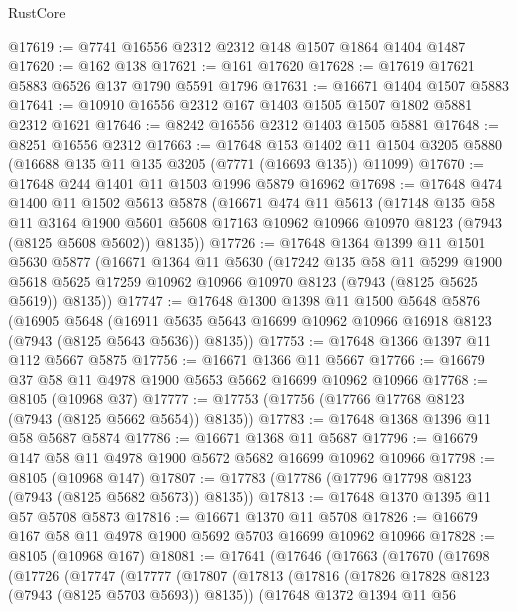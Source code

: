 \begin{lexlean}{RustCore}
\begin{coremodule}
@17619 := @7741 @16556 @2312 @2312 @148 @1507 @1864 @1404 @1487
@17620 := @162 @138
@17621 := @161 @17620
@17628 := @17619 @17621 @5883 @6526 @137 @1790 @5591 @1796
@17631 := @16671 @1404 @1507 @5883
@17641 := @10910 @16556 @2312 @167 @1403 @1505 @1507 @1802 @5881 @2312 @1621
@17646 := @8242 @16556 @2312 @1403 @1505 @5881
@17648 := @8251 @16556 @2312
@17663 := @17648
    @153
    @1402
    @11
    @1504
    @3205
    @5880
    (@16688 @135 @11 @135 @3205 (@7771 (@16693 @135)) @11099)
@17670 := @17648 @244 @1401 @11 @1503 @1996 @5879 @16962
@17698 := @17648
    @474
    @1400
    @11
    @1502
    @5613
    @5878
    (@16671
      @474
      @11
      @5613
      (@17148
        @135
        @58
        @11
        @3164
        @1900
        @5601
        @5608
        @17163
        @10962
        @10966
        @10970
        @8123
        (@7943 (@8125 @5608 @5602))
        @8135))
@17726 := @17648
    @1364
    @1399
    @11
    @1501
    @5630
    @5877
    (@16671
      @1364
      @11
      @5630
      (@17242
        @135
        @58
        @11
        @5299
        @1900
        @5618
        @5625
        @17259
        @10962
        @10966
        @10970
        @8123
        (@7943 (@8125 @5625 @5619))
        @8135))
@17747 := @17648
    @1300
    @1398
    @11
    @1500
    @5648
    @5876
    (@16905
      @5648
      (@16911 @5635 @5643 @16699 @10962 @10966 @16918 @8123 (@7943 (@8125 @5643 @5636)) @8135))
@17753 := @17648 @1366 @1397 @11 @112 @5667 @5875
@17756 := @16671 @1366 @11 @5667
@17766 := @16679 @37 @58 @11 @4978 @1900 @5653 @5662 @16699 @10962 @10966
@17768 := @8105 (@10968 @37)
@17777 := @17753 (@17756 (@17766 @17768 @8123 (@7943 (@8125 @5662 @5654)) @8135))
@17783 := @17648 @1368 @1396 @11 @58 @5687 @5874
@17786 := @16671 @1368 @11 @5687
@17796 := @16679 @147 @58 @11 @4978 @1900 @5672 @5682 @16699 @10962 @10966
@17798 := @8105 (@10968 @147)
@17807 := @17783 (@17786 (@17796 @17798 @8123 (@7943 (@8125 @5682 @5673)) @8135))
@17813 := @17648 @1370 @1395 @11 @57 @5708 @5873
@17816 := @16671 @1370 @11 @5708
@17826 := @16679 @167 @58 @11 @4978 @1900 @5692 @5703 @16699 @10962 @10966
@17828 := @8105 (@10968 @167)
@18081 := @17641
    (@17646
      (@17663
        (@17670
          (@17698
            (@17726
              (@17747
                (@17777
                  (@17807
                    (@17813
                      (@17816 (@17826 @17828 @8123 (@7943 (@8125 @5703 @5693)) @8135))
                      (@17648
                        @1372
                        @1394
                        @11
                        @56

\end{coremodule}
\end{lexlean}
